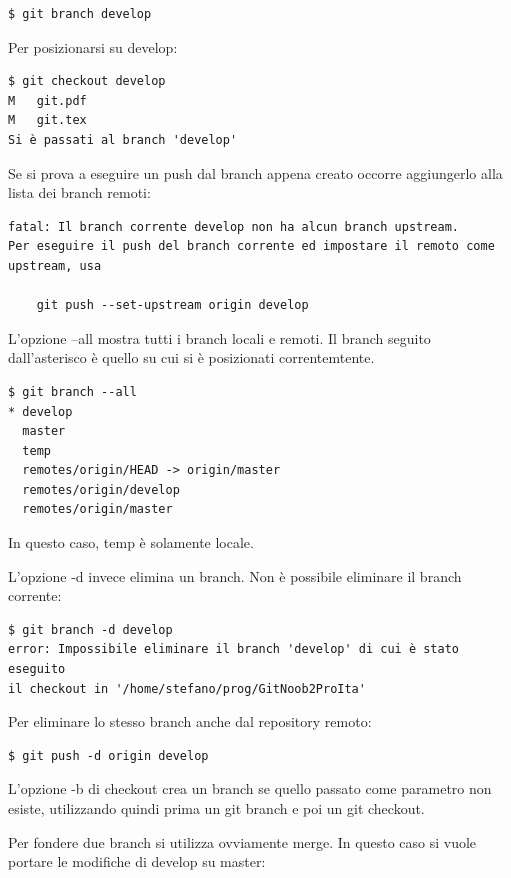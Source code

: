 \documentclass{article} \usepackage[textwidth=19cm,textheight=24cm]{geometry}
\begin{document}
\begin{verbatim}
$ git branch develop
\end{verbatim}

Per posizionarsi su develop:

\begin{verbatim}
$ git checkout develop
M	git.pdf
M	git.tex
Si è passati al branch 'develop'
\end{verbatim}

Se si prova a eseguire un push dal branch appena creato occorre
aggiungerlo alla lista dei branch remoti:

\begin{verbatim}
fatal: Il branch corrente develop non ha alcun branch upstream.
Per eseguire il push del branch corrente ed impostare il remoto come upstream, usa

    git push --set-upstream origin develop
\end{verbatim}

L'opzione --all mostra tutti i branch locali e remoti. Il branch seguito
dall'asterisco è quello su cui si è posizionati correntemtente.

\begin{verbatim}
$ git branch --all
* develop
  master
  temp
  remotes/origin/HEAD -> origin/master
  remotes/origin/develop
  remotes/origin/master
\end{verbatim}

In questo caso, temp è solamente locale.

L'opzione -d invece elimina un branch. Non è possibile eliminare il branch corrente:

\begin{verbatim}
$ git branch -d develop
error: Impossibile eliminare il branch 'develop' di cui è stato eseguito 
il checkout in '/home/stefano/prog/GitNoob2ProIta'
\end{verbatim}

Per eliminare lo stesso branch anche dal repository remoto:

\begin{verbatim}
$ git push -d origin develop
\end{verbatim}

L'opzione -b di checkout crea un branch se quello passato come parametro non
esiste, utilizzando quindi prima un git branch e poi un git checkout.

Per fondere due branch si utilizza ovviamente merge. In questo caso si vuole
portare le modifiche di develop su master:
\end{document}
